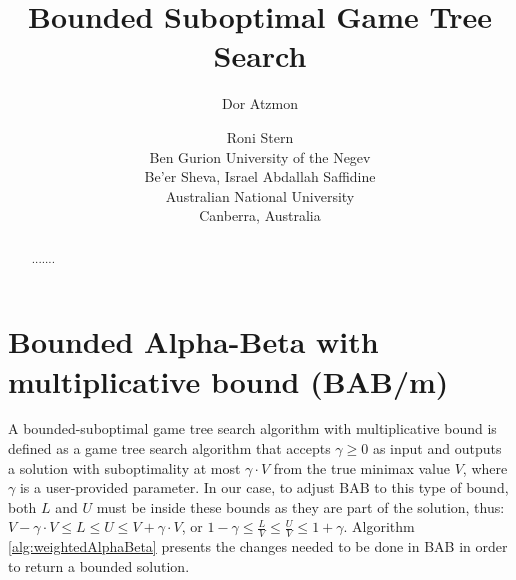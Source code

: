 \documentclass[letterpaper]{article} %
\newcounter{bab}
\newcommand{\MM}{\mathit{V}}
\newcommand{\pess}{\mathit{L}}
\newcommand{\opti}{\mathit{U}}
\begin{document}
\title{Bounded Suboptimal Game Tree Search}
\author{Dor Atzmon \and Roni Stern\\
Ben Gurion University of the Negev\\
Be'er Sheva, Israel
\And
Abdallah Saffidine \\
Australian National University\\
Canberra, Australia}

\maketitle

\begin{abstract}
.......
\end{abstract}



\section{Bounded Alpha-Beta with multiplicative bound (BAB/m)} 

A bounded-suboptimal game tree search algorithm with multiplicative bound is defined as a game tree search algorithm that accepts $\gamma \geq 0$ as input and outputs a solution with suboptimality at most $\gamma \cdot \MM$ from the true minimax value $\MM$, where $\gamma$ is a user-provided parameter. In our case, to adjust BAB to this type of bound, both $\pess$ and $\opti$ must be inside these bounds as they are part of the solution, thus: $\MM - \gamma \cdot \MM \leq \pess \leq \opti \leq \MM + \gamma \cdot \MM$, or $1 - \gamma \leq \frac{\pess}{\MM} \leq \frac{\opti}{\MM} \leq 1 + \gamma$.
Algorithm \ref{alg:weightedAlphaBeta} presents the changes needed to be done in BAB in order to return a bounded solution.


 \label{sec:bab}
\end{document}
